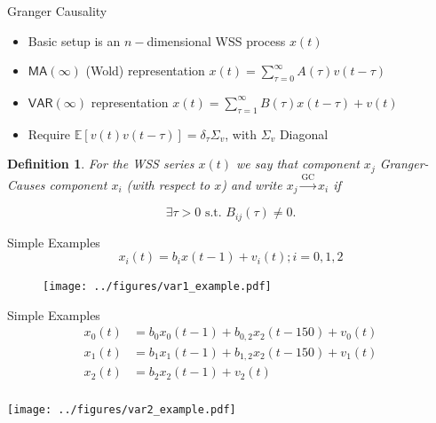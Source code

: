 \documentclass{beamer} %
\newtheorem*{defn}{Definition}
\def\E{\mathbb{E}}  %
\def\gc{\overset{\text{GC}}{\rightarrow}}  %
\def\pwgc{\overset{\text{PW}}{\rightarrow}}  %
\def\VAR{\mathsf{VAR}}  %
\begin{document}
\begin{frame}{Granger Causality}
  \begin{itemize}
    \item{Basic setup is an $n-$dimensional WSS process $x(t)$}\pause
    \item{$\mathsf{MA}(\infty)$ (Wold) representation $x(t) = \sum_{\tau = 0}^\infty A(\tau)v(t - \tau)$}\pause
    \item{$\VAR(\infty)$ representation $x(t) = \sum_{\tau = 1}^\infty B(\tau)x(t - \tau) + v(t)$}\pause
    \item{Require $\E[v(t)v(t - \tau)] = \delta_{\tau}\Sigma_v$, with $\Sigma_v$ Diagonal}\pause
  \end{itemize}

  \begin{defn}
    For the WSS series $x(t)$ we say that component $x_j$
    \textit{Granger-Causes} component $x_i$ (with respect to $x$)
    and write $x_j \gc x_i$ if

    \begin{equation*}
      \exists \tau > 0 \text{ s.t. } B_{ij}(\tau) \ne 0.
    \end{equation*}
  \end{defn}\pause

\end{frame}

\begin{frame}{Simple Examples}
  \begin{equation*}
    x_i(t) = b_i x(t - 1) + v_i(t); i = 0, 1, 2
  \end{equation*}

  \begin{figure}
    \texttt{[image: ../figures/var1\_example.pdf]}
  \end{figure}
\end{frame}

\begin{frame}{Simple Examples}
  \begin{equation*}
    \begin{aligned}
      x_0(t) &= b_0 x_0(t - 1) + b_{0, 2} x_2(t - 150) + v_0(t)\\
      x_1(t) &= b_1 x_1(t - 1) + b_{1, 2} x_2(t - 150) + v_1(t)\\
      x_2(t) &= b_2 x_2(t - 1) + v_2(t)\\
    \end{aligned}
  \end{equation*}

  \centering
  \texttt{[image: ../figures/var2\_example.pdf]}
\end{frame}
\end{document}
